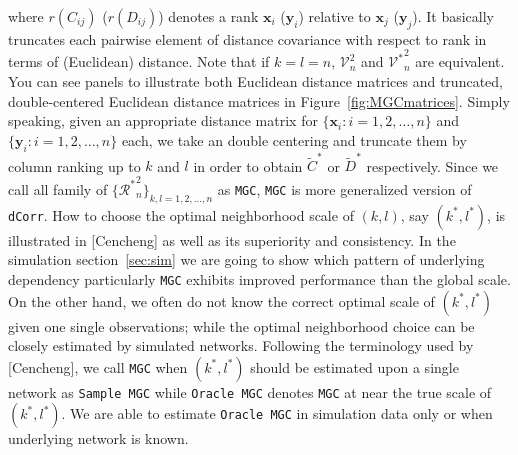\documentclass[12pt]{article}
\theoremstyle{definition}
\begin{document}
where $r(C_{ij})$ ($r(D_{ij})$) denotes a rank $\mathbf{x}_{i}$ ($\mathbf{y}_{i}$) relative to $\mathbf{x}_{j}$ ($\mathbf{y}_{j}$). It basically truncates each pairwise element of distance covariance with respect to rank in terms of (Euclidean) distance. Note that if $k=l=n$, $\mathcal{V}^2_{n}$ and ${\mathcal{V}^{*}}^2_{n}$ are equivalent. You can see panels to illustrate both Euclidean distance matrices and truncated, double-centered Euclidean distance matrices in Figure~\ref{fig:MGCmatrices}. Simply speaking, given an appropriate distance matrix for $\{  \mathbf{x}_{i}  : i = 1,2, \ldots, n \}$ and $\{ \mathbf{y}_{i} : i=1,2,\ldots, n \}$ each, we take an double centering and truncate them by column ranking up to $k$ and $l$ in order to obtain $\tilde{C}^{*}$ or $\tilde{D}^{*}$ respectively. Since we call all family of $\{  {\mathcal{R}^{*}}^2_{n} \}_{k,l = 1,2,...,n}$ as \texttt{MGC}, \texttt{MGC} is more generalized version of \texttt{dCorr}. How to choose the optimal neighborhood scale of $(k,l)$, say $(k^{*}, l^{*})$, is illustrated in [Cencheng] as well as its superiority and consistency. In the simulation section~\ref{sec:sim} we are going to show which pattern of underlying dependency particularly \texttt{MGC} exhibits improved performance than the global scale. On the other hand, we often do not know the correct optimal scale of $(k^{*}, l^{*})$ given one single observations; while the optimal neighborhood choice can be closely estimated by simulated networks. Following the terminology used by [Cencheng], we call \texttt{MGC} when $(k^{*}, l^{*})$ should be estimated upon a single network as \texttt{Sample MGC} while \texttt{Oracle MGC} denotes \texttt{MGC} at near the true scale of $(k^{*}, l^{*})$. We are able to estimate \texttt{Oracle MGC} in simulation data only or when underlying network is known.  
\end{document}
